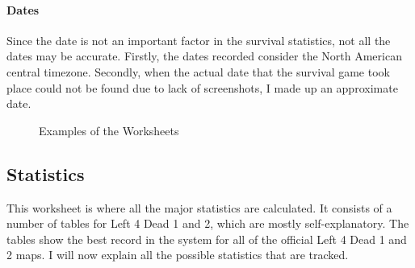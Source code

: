 \paragraph{Dates}
Since the date is not an important factor in the survival statistics, not all the dates may be accurate. Firstly, the dates recorded consider the North American central timezone. Secondly, when the actual date that the survival game took place could not be found due to lack of screenshots, I made up an approximate date.

\begin{figure}[htb!]
\centering
{}
\caption{Examples of the Worksheets}
\end{figure}

\subsection{Statistics}
This worksheet is where all the major statistics are calculated. It consists of a number of tables for Left 4 Dead 1 and 2, which are mostly self-explanatory. The tables show the best record in the system for all of the official Left 4 Dead 1 and 2 maps. I will now explain all the possible statistics that are tracked.

